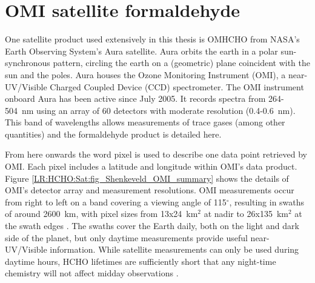 

\section{OMI satellite formaldehyde}
\label{Model:omhcho}
  
  One satellite product used extensively in this thesis is OMHCHO from NASA's Earth Observing System's Aura satellite. %
  Aura orbits the earth in a polar sun-synchronous pattern, circling the earth on a (geometric) plane coincident with the sun and the poles.
  Aura houses the Ozone Monitoring Instrument (OMI), a near-UV/Visible Charged Coupled Device (CCD) spectrometer.
  The OMI instrument onboard Aura has been active since July 2005.
  It records spectra from 264-504~nm using an array of 60 detectors with moderate resolution (0.4-0.6~nm).
  This band of wavelengths allows measurements of trace gases (among other quantities) and the formaldehyde product is detailed here.
  
  
  From here onwards the word pixel is used to describe one data point retrieved by OMI.
  Each pixel includes a latitude and longitude within OMI's data product.
  Figure \ref{LR:HCHO:Sat:fig_Shenkeveld_OMI_summary} shows the details of OMI's detector array and measurement resolutions.
  OMI measurements occur from right to left on a band covering a viewing angle of 115$^{\circ}$, resulting in swaths of around 2600~km, with pixel sizes from 13x24~km$^2$ at nadir to 26x135~km$^2$ at the swath edges \parencite{Abad2015}.
  The swaths cover the Earth daily, both on the light and dark side of the planet, but only daytime measurements provide useful near-UV/Visible information.
  While satellite measurements can only be used during daytime hours, HCHO lifetimes are sufficiently short that any night-time chemistry will not affect midday observations \parencite{Wolfe2016}.
  
